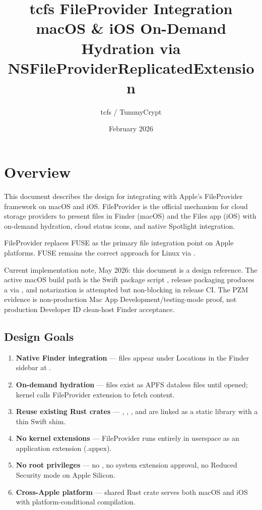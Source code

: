 \documentclass[11pt,a4paper]{article}
\title{tcfs FileProvider Integration\\
\large macOS \& iOS On-Demand Hydration via NSFileProviderReplicatedExtension}
\author{tcfs / TummyCrypt}
\date{February 2026}
\begin{document}
\maketitle
\tableofcontents
\newpage

\section{Overview}

This document describes the design for integrating \tcfs{} with Apple's
FileProvider framework on macOS and iOS. FileProvider is the official mechanism
for cloud storage providers to present files in Finder (macOS) and the Files app
(iOS) with on-demand hydration, cloud status icons, and native Spotlight
integration.

FileProvider replaces FUSE as the primary file integration point on Apple
platforms. FUSE remains the correct approach for Linux via .

Current implementation note, May 2026: this document is a design reference.
The active macOS build path is the Swift package script
, release packaging produces a
 via , and notarization is
attempted but non-blocking in release CI. The PZM evidence is non-production
Mac App Development/testing-mode proof, not production Developer ID clean-host
Finder acceptance.

\subsection{Design Goals}

\begin{enumerate}
  \item \textbf{Native Finder integration} --- files appear under Locations in
        the Finder sidebar at .
  \item \textbf{On-demand hydration} --- files exist as APFS dataless files
        until opened; kernel calls FileProvider extension to fetch content.
  \item \textbf{Reuse existing Rust crates} --- ,
        , , and  are
        linked as a static library with a thin Swift shim.
  \item \textbf{No kernel extensions} --- FileProvider runs entirely in
        userspace as an application extension (.appex).
  \item \textbf{No root privileges} --- no , no system extension
        approval, no Reduced Security mode on Apple Silicon.
  \item \textbf{Cross-Apple platform} --- shared Rust crate serves both
        macOS and iOS with platform-conditional compilation.
\end{enumerate}
\end{document}
